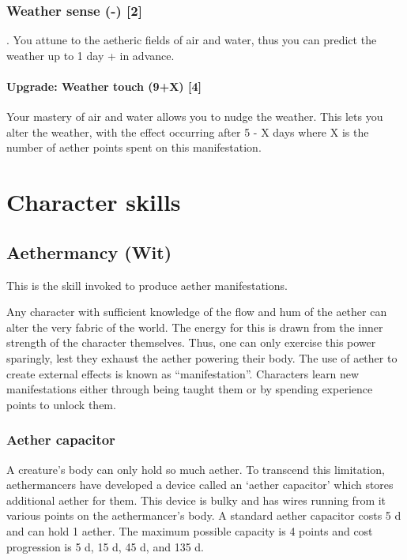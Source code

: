 \documentclass[a4paper,11pt,oneside]{book}
\newcommand{\textlf}[1]{\textbf{\titlecap{#1}}}
\begin{document}
\subsection{Weather sense (-) [2]}
\textlf{Passive perk}. You attune to the aetheric fields of air and water, thus you can predict the weather up to 1 day + \textlf{wit} in advance.
\subsubsection{Upgrade: Weather touch (9+X) [4]}
Your mastery of air and water allows you to nudge the weather. This lets you alter the weather, with the effect occurring after 5 - X days where X is the number of aether points spent on this manifestation. 



\chapter{Character skills}

\section{Aethermancy (Wit)}
\label{sec:aethermancy}
This is the skill invoked to produce aether manifestations. 

Any character with sufficient knowledge of the flow and hum of the aether can alter the very fabric of the world.  The energy for this is drawn from the inner strength of the character themselves. Thus, one can only exercise this power sparingly, lest they exhaust the aether powering their body. The use of aether to create external effects is known as ``manifestation''. Characters learn new manifestations either through being taught them or by spending experience points to unlock them.

\subsection{Aether capacitor}
\label{sec:capacitor}
A creature's body can only hold so much aether. To transcend this limitation, aethermancers have developed a device called an `aether capacitor' which stores additional aether for them. This device is bulky and has wires running from it various points on the aethermancer's body. A standard aether capacitor costs 5 d and can hold 1 aether. The maximum possible capacity is 4 points and cost progression is 5 d, 15 d, 45 d, and 135 d.
\end{document}
